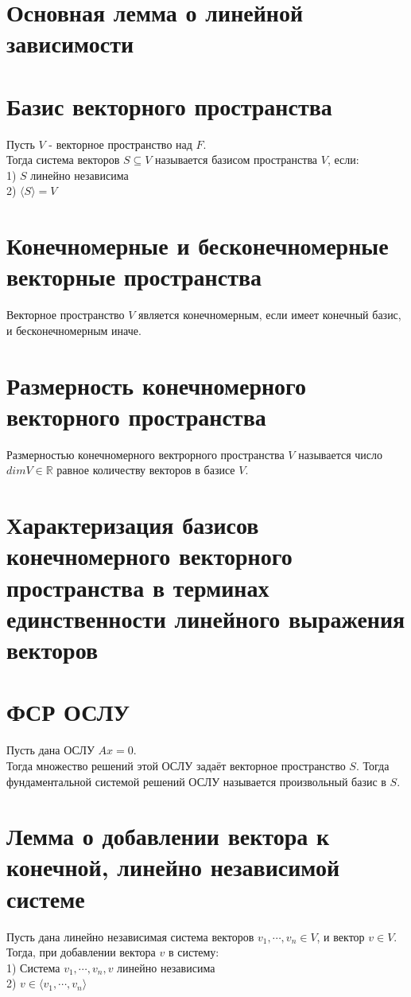 \documentclass[a4paper,11pt]{report}
\begin{document}
\section{Основная лемма о линейной зависимости}
\section{Базис векторного пространства}
Пусть $V$ - векторное пространство над $F$.\\
Тогда система векторов $S \subseteq V$ называется базисом пространства $V$, если:\\
1) $S$ линейно независима\\
2) $\langle{S}\rangle = V$\\
\section{Конечномерные и бесконечномерные векторные пространства}
Векторное пространство $V$ является конечномерным, если имеет конечный базис, и бесконечномерным иначе.
\section{Размерность конечномерного векторного пространства}
Размерностью конечномерного вектрорного пространства $V$ называется число $dim V \in \mathbb{R}$ равное количеству
векторов в базисе $V$.
\section{Характеризация базисов конечномерного векторного пространства в терминах единственности линейного выражения
векторов}
\section{ФСР ОСЛУ}
Пусть дана ОСЛУ $Ax = 0$.\\
Тогда множество решений этой ОСЛУ задаёт векторное пространство $S$. 
Тогда фундаментальной системой решений ОСЛУ называется произвольный базис в $S$.
\section{Лемма о добавлении вектора к конечной, линейно независимой системе}
Пусть дана линейно независимая система векторов $v_1, \cdots, v_n \in V$, и вектор $v \in V$.\\
Тогда, при добавлении вектора $v$ в систему:\\
1) Система $v_1, \cdots, v_n, v$ линейно независима\\
2) $v \in \langle v_1, \cdots, v_n \rangle$
\end{document}

